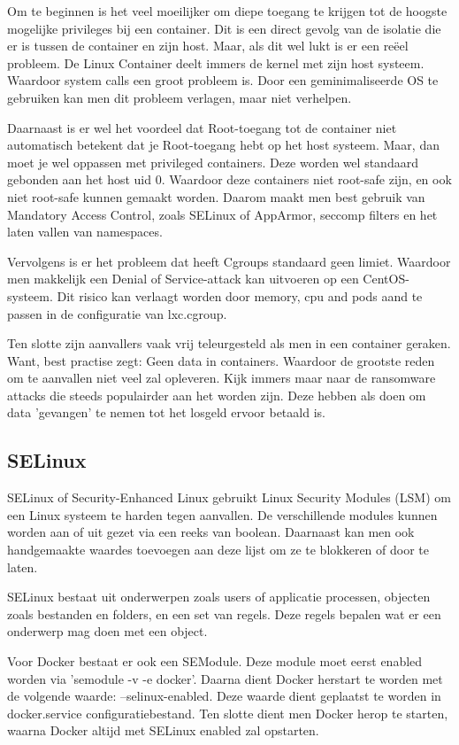 Om te beginnen is het veel moeilijker om diepe toegang te krijgen tot de hoogste mogelijke privileges bij een container. Dit is een direct gevolg van de isolatie die er is tussen de container en zijn host. Maar, als dit wel lukt is er een reëel probleem. De Linux Container deelt immers de kernel met zijn host systeem. Waardoor system calls een groot probleem is. Door een geminimaliseerde OS te gebruiken kan men dit probleem verlagen, maar niet verhelpen.

Daarnaast is er wel het voordeel dat Root-toegang tot de container niet automatisch betekent dat je Root-toegang hebt op het host systeem. Maar, dan moet je wel oppassen met privileged containers. Deze worden wel standaard gebonden aan het host uid 0. Waardoor deze containers niet root-safe zijn, en ook niet root-safe kunnen gemaakt worden. Daarom maakt men best gebruik van Mandatory Access Control, zoals SELinux of AppArmor, seccomp filters en het laten vallen van namespaces.

Vervolgens is er het probleem dat heeft Cgroups standaard geen limiet. Waardoor men makkelijk een Denial of Service-attack kan uitvoeren op een CentOS-systeem. Dit risico kan verlaagt worden door memory, cpu and pods aand te passen in de configuratie van lxc.cgroup.

Ten slotte zijn aanvallers vaak vrij teleurgesteld als men in een container geraken. Want, best practise zegt: Geen data in containers. Waardoor de grootste reden om te aanvallen niet veel zal opleveren. Kijk immers maar naar de ransomware attacks die steeds populairder aan het worden zijn. Deze hebben als doen om data 'gevangen' te nemen tot het losgeld ervoor betaald is.

\subsection{SELinux}
SELinux of Security-Enhanced Linux gebruikt Linux Security Modules (LSM) om een Linux systeem te harden tegen aanvallen. De verschillende modules kunnen worden aan of uit gezet via een reeks van boolean. Daarnaast kan men ook handgemaakte waardes toevoegen aan deze lijst om ze te blokkeren of door te laten.

SELinux bestaat uit onderwerpen zoals users of applicatie processen, objecten zoals bestanden en folders, en een set van regels. Deze regels bepalen wat er een onderwerp mag doen met een object.

Voor Docker bestaat er ook een SEModule. Deze module moet eerst enabled worden via 'semodule -v -e docker'. Daarna dient Docker herstart te worden met de volgende waarde: --selinux-enabled. Deze waarde dient geplaatst te worden in docker.service configuratiebestand. Ten slotte dient men Docker herop te starten, waarna Docker altijd met SELinux enabled zal opstarten.

